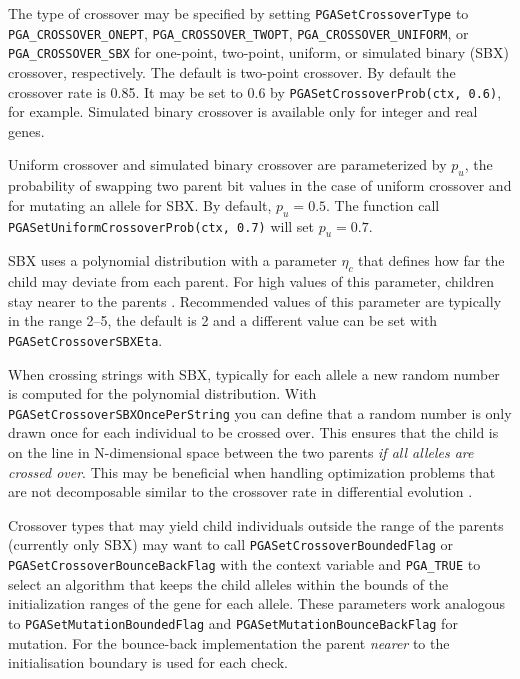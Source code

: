 \documentclass{report}
\begin{document}
\begin{sloppypar}
%
The type of crossover may be specified by setting \verb+PGASetCrossoverType+
to \verb+PGA_CROSSOVER_ONEPT+, \verb+PGA_CROSSOVER_TWOPT+,
\verb+PGA_CROSSOVER_UNIFORM+, or \verb+PGA_CROSSOVER_SBX+ for one-point,
two-point, uniform, or simulated binary (SBX) crossover,
respectively.  The default is two-point crossover.  By default the crossover
rate is 0.85.  It may be set to 0.6 by {\tt PGASetCrossoverProb(ctx, 0.6)},
for example. Simulated binary crossover is available only for integer
and real genes.
\end{sloppypar}

Uniform crossover and simulated binary crossover are parameterized by
$p_u$, the probability of swapping two parent bit values \cite{SpDe91}
in the case of uniform crossover and for mutating an allele for SBX.
By default, $p_u = 0.5$.  The function call {\tt
PGASetUniformCrossoverProb(ctx, 0.7)} will set $p_u = 0.7$.

SBX uses a polynomial distribution with a parameter $\eta_c$ that defines
how far the child may deviate from each parent. For high values of this
parameter, children stay nearer to the parents \cite{DA95}. Recommended
values of this parameter are typically in the range 2--5, the default is
2 and a different value can be set with \verb+PGASetCrossoverSBXEta+.

When crossing strings with SBX, typically for each allele a new random
number is computed for the polynomial distribution. With
\verb+PGASetCrossoverSBXOncePerString+ you can define that a random
number is only drawn once for each individual to be crossed over.
This ensures that the child is on the line in N-dimensional space
between the two parents \textit{if all alleles are crossed over}.
This may be beneficial when handling optimization problems that are not
decomposable \cite{Sal96} similar to the crossover rate in differential
evolution \cite[p.~98]{PSL05}.

Crossover types that may yield child individuals outside the range of
the parents (currently only SBX) may want to call
\verb+PGASetCrossoverBoundedFlag+ or \verb+PGASetCrossoverBounceBackFlag+
with the context variable and \verb+PGA_TRUE+ to select an algorithm
that keeps the child alleles within the bounds of the initialization
ranges of the gene for each allele. These parameters work analogous to
\verb+PGASetMutationBoundedFlag+ and \verb+PGASetMutationBounceBackFlag+
for mutation. For the bounce-back implementation the parent
\textit{nearer} to the initialisation boundary is used for each check.
\end{document}
